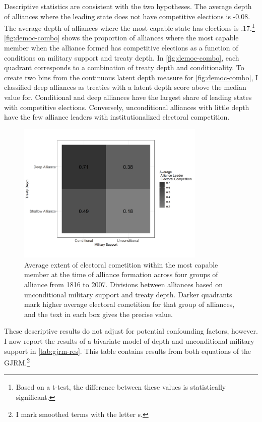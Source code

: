 \documentclass[12pt]{article}
\begin{document}
Descriptive statistics are consistent with the two hypotheses.
The average depth of alliances where the leading state does not have competitive elections is -0.08. 
The average depth of alliances where the most capable state has elections is .17.\footnote{Based on a t-test, the difference between these values is statistically significant.} 
\autoref{fig:democ-combo} shows the proportion of alliances where the most capable member when the alliance formed has competitive elections as a function of conditions on military support and treaty depth.
In \autoref{fig:democ-combo}, each quadrant corresponds to a combination of treaty depth and conditionality. 
To create two bins from the continuous latent depth measure for \autoref{fig:democ-combo}, I classified deep alliances as treaties with a latent depth score above the median value for. 
Conditional and deep alliances have the largest share of leading states with competitive elections. 
Conversely, unconditional alliances with little depth have the few alliance leaders with institutionalized electoral competition. 


\begin{figure}[hbtp]
\centering
\includegraphics[width=0.8\textwidth]{../figures/democ-combo.png}
\caption{Average extent of electoral cometition within the most capable member at the time of alliance formation across four groups of alliance from 1816 to 2007. Divisions between alliances based on unconditional military support and treaty depth. Darker quadrants mark higher average electoral cometition for that group of alliances, and the text in each box gives the precise value.}
\label{fig:democ-combo}
\end{figure}


These descriptive results do not adjust for potential confounding factors, however.
I now report the results of a bivariate model of depth and unconditional military support in \autoref{tab:gjrm-res}. 
This table contains results from both equations of the GJRM.\footnote{I mark smoothed terms with the letter s.} 
\end{document}
